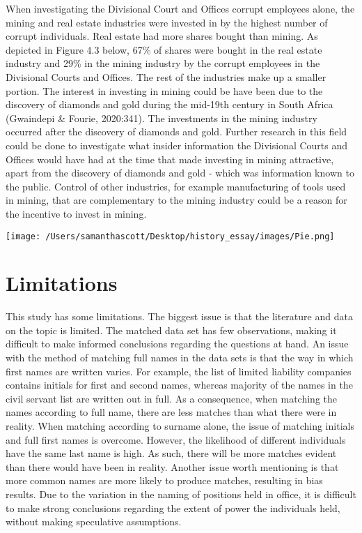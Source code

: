 \documentclass[12pt,preprint, authoryear]{elsarticle}
\let\origfigure\figure
\let\endorigfigure\endfigure
\renewenvironment{figure}[1][2] {
    \expandafter\origfigure\expandafter[H]
} {
    \endorigfigure
}
\numberwithin{equation}{section}
\numberwithin{figure}{section}
\numberwithin{table}{section}
\begin{document}
When investigating the Divisional Court and Offices corrupt employees
alone, the mining and real estate industries were invested in by the
highest number of corrupt individuals. Real estate had more shares
bought than mining. As depicted in Figure 4.3 below, 67\% of shares were
bought in the real estate industry and 29\% in the mining industry by
the corrupt employees in the Divisional Courts and Offices. The rest of
the industries make up a smaller portion. The interest in investing in
mining could be have been due to the discovery of diamonds and gold
during the mid-19th century in South Africa (Gwaindepi \& Fourie,
2020:341). The investments in the mining industry occurred after the
discovery of diamonds and gold. Further research in this field could be
done to investigate what insider information the Divisional Courts and
Offices would have had at the time that made investing in mining
attractive, apart from the discovery of diamonds and gold - which was
information known to the public. Control of other industries, for
example manufacturing of tools used in mining, that are complementary to
the mining industry could be a reason for the incentive to invest in
mining.

\begin{figure}
\centering
\texttt{[image: /Users/samanthascott/Desktop/history\_essay/images/Pie.png]}
\caption{Number of Shares per Industry, According to Divisional Courts
and Offices}
\end{figure}

\hypertarget{limitations}{%
\section{Limitations}\label{limitations}}

This study has some limitations. The biggest issue is that the
literature and data on the topic is limited. The matched data set has
few observations, making it difficult to make informed conclusions
regarding the questions at hand. An issue with the method of matching
full names in the data sets is that the way in which first names are
written varies. For example, the list of limited liability companies
contains initials for first and second names, whereas majority of the
names in the civil servant list are written out in full. As a
consequence, when matching the names according to full name, there are
less matches than what there were in reality. When matching according to
surname alone, the issue of matching initials and full first names is
overcome. However, the likelihood of different individuals have the same
last name is high. As such, there will be more matches evident than
there would have been in reality. Another issue worth mentioning is that
more common names are more likely to produce matches, resulting in bias
results. Due to the variation in the naming of positions held in office,
it is difficult to make strong conclusions regarding the extent of power
the individuals held, without making speculative assumptions.
\end{document}
